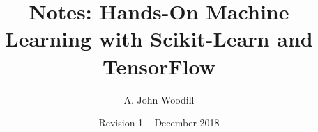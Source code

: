 \documentclass[11pt]{article}%
\title{Notes: Hands-On Machine Learning with Scikit-Learn and TensorFlow}
\author{A. John Woodill \date{\normalsize Revision 1 -- December 2018}}
\begin{document}
\maketitle

\newpage

\tableofcontents

\newpage

\singlespacing

\end{document}
